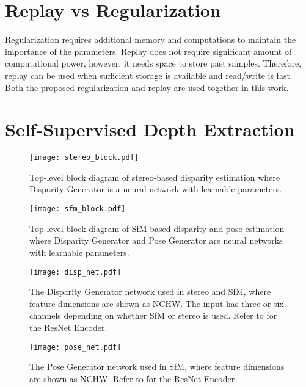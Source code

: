 \documentclass[lettersize,journal]{IEEEtran}
\begin{document}
 \section{Replay vs Regularization}
  \noindent Regularization requires additional memory and computations to maintain the importance of the parameters. Replay does not require significant amount of computational power, however, it needs space to store past samples. Therefore, replay can be used when sufficient storage is available and read/write is fast. Both the proposed regularization and replay are used together in this work.
 
 \section{Self-Supervised Depth Extraction}
 \begin{figure}[t]
    \begin{center}
       \texttt{[image: stereo\_block.pdf]}
       \caption{Top-level block diagram of stereo-based disparity estimation where Disparity Generator is a neural network with learnable parameters.}
       \label{fig:block_stereo}
    \end{center}
 \end{figure}
 
 \begin{figure}[t]
 \begin{center}
    \texttt{[image: sfm\_block.pdf]}
    \caption{Top-level block diagram of SfM-based disparity and pose estimation where Disparity Generator and Pose Generator are neural networks with learnable parameters.}
    \label{fig:block_sfm}
 \end{center}
 \end{figure}
 
 \begin{figure*}[t]
 \begin{center}
    \texttt{[image: disp\_net.pdf]}
    \caption{The Disparity Generator network used in stereo and SfM, where feature dimensions are shown as NCHW. The input has three or six channels depending on whether SfM or stereo is used. Refer to \cite{he2016deep} for the ResNet Encoder.}
    \label{fig:disp_ops}
 \end{center}
 \end{figure*}
 
 \begin{figure*}[t]
 \begin{center}
    \texttt{[image: pose\_net.pdf]}
    \caption{The Pose Generator network used in SfM, where feature dimensions are shown as NCHW. Refer to \cite{he2016deep} for the ResNet Encoder.}
    \label{fig:pose_ops}
 \end{center}
 \end{figure*}
 
\end{document}
